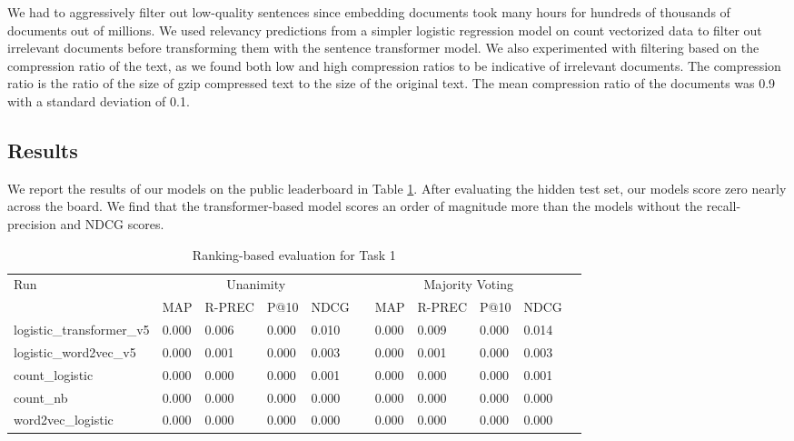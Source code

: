 \documentclass[]{style/ceurart}
\begin{document}
We had to aggressively filter out low-quality sentences since embedding documents took many hours for hundreds of thousands of documents out of millions.
We used relevancy predictions from a simpler logistic regression model on count vectorized data to filter out irrelevant documents before transforming them with the sentence transformer model.
We also experimented with filtering based on the compression ratio of the text, as we found both low and high compression ratios to be indicative of irrelevant documents.
The compression ratio is the ratio of the size of gzip compressed text to the size of the original text.
The mean compression ratio of the documents was 0.9 with a standard deviation of 0.1.

\subsection{Results}

We report the results of our models on the public leaderboard in Table \ref{tab:task1-results}.
After evaluating the hidden test set, our models score zero nearly across the board.
We find that the transformer-based model scores an order of magnitude more than the models without the recall-precision and NDCG scores.


\begin{table}[h]
\centering
\caption{Ranking-based evaluation for Task 1}
\label{tab:task1-results}
\begin{tabular}{lllllllllll}
\toprule
Run & \multicolumn{4}{c}{Unanimity} & & \multicolumn{4}{c}{Majority Voting} \\
\cmidrule{2-5} \cmidrule{7-10}
 & MAP & R-PREC & P@10 & NDCG & & MAP & R-PREC & P@10 & NDCG \\
\midrule
logistic\_transformer\_v5 & 0.000 & 0.006 & 0.000 & 0.010 & & 0.000 & 0.009 & 0.000 & 0.014 \\
logistic\_word2vec\_v5 & 0.000 & 0.001 & 0.000 & 0.003 & & 0.000 & 0.001 & 0.000 & 0.003 \\
count\_logistic & 0.000 & 0.000 & 0.000 & 0.001 & & 0.000 & 0.000 & 0.000 & 0.001 \\
count\_nb & 0.000 & 0.000 & 0.000 & 0.000 & & 0.000 & 0.000 & 0.000 & 0.000 \\
word2vec\_logistic & 0.000 & 0.000 & 0.000 & 0.000 & & 0.000 & 0.000 & 0.000 & 0.000 \\
\bottomrule
\end{tabular}
\end{table}
\end{document}
